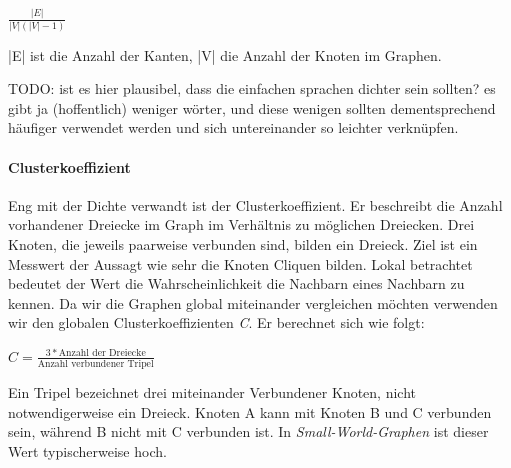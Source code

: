 \documentclass[12pt, a4paper]{article}
\begin{document}
\begin{center}
  \begin{math}
    \frac{|E|}{|V|(|V|-1)}
  \end{math}
\end{center}


|E| ist die Anzahl der Kanten, |V| die Anzahl der Knoten im Graphen. 

TODO: ist es hier plausibel, dass die einfachen sprachen dichter sein sollten?
es gibt ja (hoffentlich) weniger wörter, und diese wenigen sollten
dementsprechend häufiger verwendet werden und sich untereinander so leichter
verknüpfen.

\paragraph{Clusterkoeffizient}
Eng mit der Dichte verwandt ist der Clusterkoeffizient. Er beschreibt die
Anzahl vorhandener Dreiecke im Graph im Verhältnis zu möglichen Dreiecken. Drei
Knoten, die jeweils paarweise verbunden sind, bilden ein Dreieck. Ziel ist ein
Messwert der Aussagt wie sehr die Knoten Cliquen bilden. Lokal betrachtet
bedeutet der Wert die Wahrscheinlichkeit die Nachbarn eines Nachbarn zu kennen.
Da wir die Graphen global miteinander vergleichen möchten verwenden wir den
globalen Clusterkoeffizienten \emph{C}. Er berechnet sich wie folgt:

\begin{center}
  \begin{math}
    C = \frac{3*\text{Anzahl der Dreiecke}}{\text{Anzahl verbundener Tripel}}
  \end{math}
\end{center}


Ein Tripel bezeichnet drei miteinander Verbundener Knoten, nicht
notwendigerweise ein Dreieck. Knoten A kann mit Knoten B und C verbunden sein,
während B nicht mit C verbunden ist. In \emph{Small-World-Graphen} ist dieser
Wert typischerweise hoch. 



\end{document}
